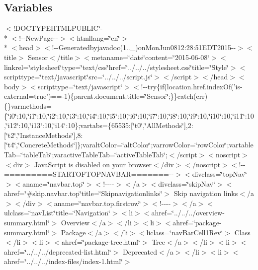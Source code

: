 \subsection*{Variables}
\begin{DoxyCompactItemize}
\item 
$<$!D\-O\-C\-T\-Y\-P\-E\-H\-T\-M\-L\-P\-U\-B\-L\-I\-C\char`\"{}-\/\\*
$<$!-\/-\/New\-Page-\/-\/$>$$<$htmllang=\char`\"{}en\char`\"{}$>$\\*
$<$head$>$$<$!-\/-\/Generatedbyjavadoc(1..\-\_)on\-Mon\-Jun0812\-:28\-:51\-E\-D\-T2015-\/-\/$>$$<$title$>$ Sensor$<$/title$>$$<$metaname=\char`\"{}date\char`\"{}content=\char`\"{}2015-\/06-\/08\char`\"{}$>$$<$linkrel=\char`\"{}stylesheet\char`\"{}type=\char`\"{}text/css\char`\"{}href=\char`\"{}../../../stylesheet.\-css\char`\"{}title=\char`\"{}\-Style\char`\"{}$>$$<$scripttype=\char`\"{}text/javascript\char`\"{}src=\char`\"{}../../../script.\-js\char`\"{}$>$$<$/script$>$$<$/head$>$$<$body$>$$<$scripttype=\char`\"{}text/javascript\char`\"{}$>$$<$!-\/-\/try\{if(location.\-href.\-index\-Of('is-\/external=true')==-\/1)\{parent.\-document.\-title=\char`\"{}\-Sensor\char`\"{};\}\}catch(err)\{\}varmethods=\{\char`\"{}i0\char`\"{}\-:10,\char`\"{}i1\char`\"{}\-:10,\char`\"{}i2\char`\"{}\-:10,\char`\"{}i3\char`\"{}\-:10,\char`\"{}i4\char`\"{}\-:10,\char`\"{}i5\char`\"{}\-:10,\char`\"{}i6\char`\"{}\-:10,\char`\"{}i7\char`\"{}\-:10,\char`\"{}i8\char`\"{}\-:10,\char`\"{}i9\char`\"{}\-:10,\char`\"{}i10\char`\"{}\-:10,\char`\"{}i11\char`\"{}\-:10,\char`\"{}i12\char`\"{}\-:10,\char`\"{}i13\char`\"{}\-:10,\char`\"{}i14\char`\"{}\-:10\};vartabs=\{65535\-:\mbox{[}\char`\"{}t0\char`\"{},\char`\"{}\-All\-Methods\char`\"{}\mbox{]},2\-:\mbox{[}\char`\"{}t2\char`\"{},\char`\"{}\-Instance\-Methods\char`\"{}\mbox{]},8\-:\mbox{[}\char`\"{}t4\char`\"{},\char`\"{}\-Concrete\-Methods\char`\"{}\mbox{]}\};varalt\-Color=\char`\"{}alt\-Color\char`\"{};varrow\-Color=\char`\"{}row\-Color\char`\"{};vartable\-Tab=\char`\"{}table\-Tab\char`\"{};varactive\-Table\-Tab=\char`\"{}active\-Table\-Tab\char`\"{};$<$/script$>$$<$noscript$>$$<$div$>$ Java\-Script is disabled on your browser$<$/div$>$$<$/noscript$>$$<$!-\/-\/=========\-S\-T\-A\-R\-T\-O\-F\-T\-O\-P\-N\-A\-V\-B\-A\-R=======-\/-\/$>$$<$divclass=\char`\"{}top\-Nav\char`\"{}$>$$<$aname=\char`\"{}navbar.\-top\char`\"{}$>$$<$!-\/-\/-\/-\/$>$$<$/a$>$$<$divclass=\char`\"{}skip\-Nav\char`\"{}$>$$<$ahref=\char`\"{}\#skip.\-navbar.\-top\char`\"{}title=\char`\"{}\-Skipnavigationlinks\char`\"{}$>$ Skip navigation links$<$/a$>$$<$/div$>$$<$aname=\char`\"{}navbar.\-top.\-firstrow\char`\"{}$>$$<$!-\/-\/-\/-\/$>$$<$/a$>$$<$ulclass=\char`\"{}nav\-List\char`\"{}title=\char`\"{}\-Navigation\char`\"{}$>$$<$li$>$$<$ahref=\char`\"{}../../../overview-\/summary.\-html\char`\"{}$>$ Overview$<$/a$>$$<$/li$>$$<$li$>$$<$ahref=\char`\"{}package-\/summary.\-html\char`\"{}$>$ Package$<$/a$>$$<$/li$>$$<$liclass=\char`\"{}nav\-Bar\-Cell1\-Rev\char`\"{}$>$ Class$<$/li$>$$<$li$>$$<$ahref=\char`\"{}package-\/tree.\-html\char`\"{}$>$ Tree$<$/a$>$$<$/li$>$$<$li$>$$<$ahref=\char`\"{}../../../deprecated-\/list.\-html\char`\"{}$>$ Deprecated$<$/a$>$$<$/li$>$$<$li$>$$<$ahref=\char`\"{}../../../index-\/files/index-\/1.\-html\char`\"{}$>$ $$
\end{DoxyCompactItemize}
